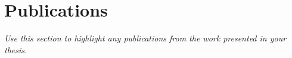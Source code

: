\newpage

   
{}
\chapter*{Publications}

\emph{Use this section to highlight any publications from the work presented in your thesis.}

\lipsum[3-4]